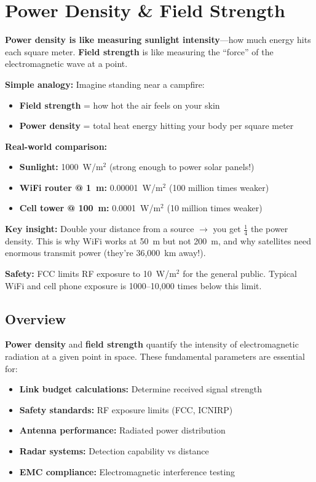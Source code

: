 \chapter{Power Density \& Field Strength}
\label{ch:power-density-field-strength}

\begin{nontechnical}
\textbf{Power density is like measuring sunlight intensity}---how much energy hits each square meter. \textbf{Field strength} is like measuring the ``force'' of the electromagnetic wave at a point.

\textbf{Simple analogy:} Imagine standing near a campfire:
\begin{itemize}
\item \textbf{Field strength} = how hot the air feels on your skin
\item \textbf{Power density} = total heat energy hitting your body per square meter
\end{itemize}

\textbf{Real-world comparison:}
\begin{itemize}
\item \textbf{Sunlight:} 1000~W/m$^2$ (strong enough to power solar panels!)
\item \textbf{WiFi router @ 1~m:} 0.00001~W/m$^2$ (100 million times weaker)
\item \textbf{Cell tower @ 100~m:} 0.0001~W/m$^2$ (10 million times weaker)
\end{itemize}

\textbf{Key insight:} Double your distance from a source $\rightarrow$ you get $\frac{1}{4}$ the power density. This is why WiFi works at 50~m but not 200~m, and why satellites need enormous transmit power (they're 36,000~km away!).

\textbf{Safety:} FCC limits RF exposure to 10~W/m$^2$ for the general public. Typical WiFi and cell phone exposure is 1000--10,000 times below this limit.
\end{nontechnical}

\section{Overview}

\textbf{Power density} and \textbf{field strength} quantify the intensity of electromagnetic radiation at a given point in space. These fundamental parameters are essential for:

\begin{itemize}
\item \textbf{Link budget calculations:} Determine received signal strength
\item \textbf{Safety standards:} RF exposure limits (FCC, ICNIRP)
\item \textbf{Antenna performance:} Radiated power distribution
\item \textbf{Radar systems:} Detection capability vs distance
\item \textbf{EMC compliance:} Electromagnetic interference testing
\end{itemize}

